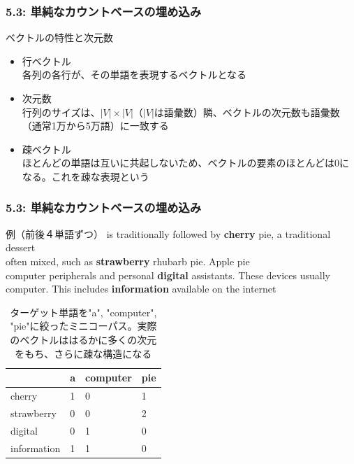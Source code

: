 \documentclass[unicode,11pt]{beamer} %
\begin{document}
\begin{frame}
    \frametitle{5.3: 単純なカウントベースの埋め込み}
    \begin{alertblock}{ベクトルの特性と次元数}
        \begin{itemize}
            \item 行ベクトル\\各列の各行が、その単語を表現するベクトルとなる
            \item 次元数\\行列のサイズは、$|V| \times |V|$（$|V|$は語彙数）隣、ベクトルの次元数も語彙数（通常1万から5万語）に一致する
            \item 疎ベクトル\\ほとんどの単語は互いに共起しないため、ベクトルの要素のほとんどは0になる。これを疎な表現という
        \end{itemize}
    \end{alertblock}
\end{frame}

\begin{frame}
    \frametitle{5.3: 単純なカウントベースの埋め込み}
    \begin{alertblock}{例（前後４単語ずつ）}
        is traditionally followed by \textbf{cherry} pie, a traditional dessert\\
        often mixed, such as \textbf{strawberry} rhubarb pie. Apple pie\\
        computer peripherals and personal \textbf{digital} assistants. These devices usually\\
        computer. This includes \textbf{information} available on the internet
    \end{alertblock}
    \begin{table}
        \centering
        \caption{ターゲット単語を"a", "computer", "pie"に絞ったミニコーパス。実際のベクトルははるかに多くの次元をもち、さらに疎な構造になる}
        \begin{tabular}{llll}
            \hline
            &a&computer&pie\\
            \hline
            cherry&1&0&1\\
            strawberry&0&0&2\\
            digital&0&1&0\\
            information&1&1&0\\
            \hline
        \end{tabular}
    \end{table}
\end{frame}
\end{document}
